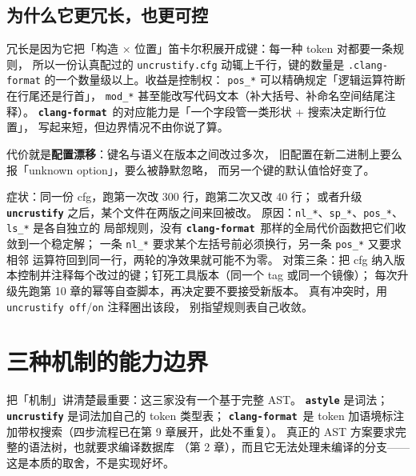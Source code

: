 \documentclass[12pt,a4paper,fontset=fandol]{ctexbook}
\newcommand{\Bk}{\discretionary{}{}{}}
\newcommand{\Lib}[1]{\textbf{\texttt{#1}}}
\newcommand{\Fmt}{\Lib{clang-format}}
\begin{document}
\subsection{为什么它更冗长，也更可控}\label{sec:ch11-s2-why}

冗长是因为它把「构造 × 位置」笛卡尔积展开成键：每一种 token 对都要一条规则，
所以一份认真配过的 \texttt{uncrustify.cfg} 动辄上千行，键的数量是
\texttt{.clang-format} 的一个数量级以上。收益是控制权：
\texttt{pos\_*} 可以精确规定「逻辑运算符断在行尾还是行首」，
\texttt{mod\_*} 甚至能改写代码文本（补大括号、补命名空间结尾注释）。
\Fmt\ 的对应能力是「一个字段管一类形状 + 搜索决定断行位置」，
写起来短，但边界情况不由你说了算。

代价就是\textbf{配置漂移}：键名与语义在版本之间改过多次，
旧配置在新二进制上要么报「unknown option」，要么被静默忽略，
而另一个键的默认值恰好变了。

\begin{warning}[title={\texttt{nl\_*} 组合爆炸导致非幂等}]
  症状：同一份 cfg，跑第一次改 300 行，跑第二次又改 40 行；
  或者升级 \Lib{uncrustify} 之后，某个文件在两版之间来回被改。
  原因：\texttt{nl\_*}、\texttt{sp\_*}、\texttt{pos\_*}、\texttt{ls\_*} 是各自独立的
  局部规则，没有 \Fmt\ 那样的全局代价函数把它们收敛到一个稳定解；
  一条 \texttt{nl\_*} 要求某个左括号前必须换行，另一条 \texttt{pos\_*} 又要求相邻
  运算符回到同一行，两轮的净效果就可能不为零。
  对策三条：把 cfg 纳入版本控制并注释每个改过的键；钉死工具版本（同一个 tag 或同一个镜像）；
  每次升级先跑第 10 章的幂等自查脚本，再决定要不要接受新版本。
  真有冲突时，用 \texttt{uncrustify off}/{\Bk}\texttt{on} 注释圈出该段，
  别指望规则表自己收敛。
\end{warning}

\section{三种机制的能力边界}\label{sec:ch11-s3}

把「机制」讲清楚最重要：这三家没有一个基于完整 AST。
\Lib{astyle} 是词法；\Lib{uncrustify} 是词法加自己的 token 类型表；
\Fmt\ 是 token 加语境标注加带权搜索（四步流程已在第 9 章展开，此处不重复）。
真正的 AST 方案要求完整的语法树，也就要求编译数据库
（第 2 章），而且它无法处理未编译的分支——这是本质的取舍，不是实现好坏。
\end{document}
